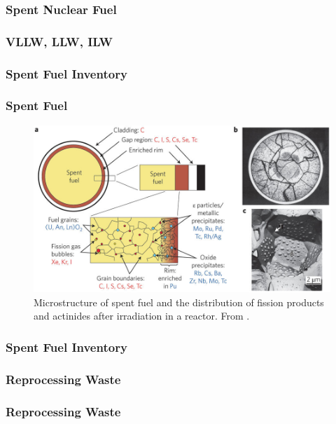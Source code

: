 
\begin{frame}[c]
  \frametitle{Spent Nuclear Fuel}
  
\end{frame}

\begin{frame}[fragile]
        \frametitle{VLLW, LLW, ILW}
                
\end{frame}

\begin{frame}[fragile]
        \frametitle{Spent Fuel Inventory}
                
\end{frame}

\begin{frame}[fragile]
        \frametitle{Spent Fuel}
        \begin{figure}
        \includegraphics[width=\textwidth]{./images/ewing-microstructure}
                \caption{Microstructure of spent fuel and the distribution of
                fission products and actinides after irradiation in a reactor.
                From \cite{ewing_long-term_2015}.}
        \end{figure}
\end{frame}

\begin{frame}[fragile]
        \frametitle{Spent Fuel Inventory}
                
\end{frame}


\begin{frame}[fragile]
        \frametitle{Reprocessing Waste}
                
\end{frame}

\begin{frame}[fragile]
        \frametitle{Reprocessing Waste}
                
\end{frame}

